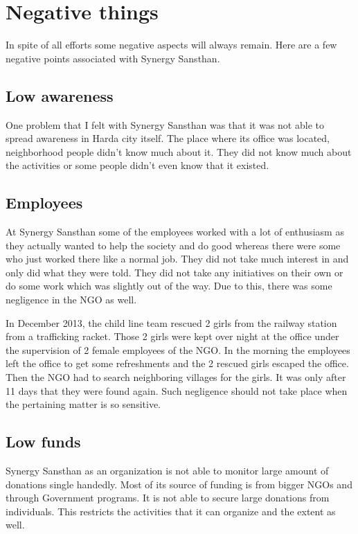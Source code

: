 \chapter{Negative things}
\ifpdf
    \graphicspath{{Chapter2/Chapter2Figs/PNG/}{Chapter2/Chapter2Figs/PDF/}{Chapter2/Chapter2Figs/}}
\else
    \graphicspath{{Chapter2/Chapter2Figs/EPS/}{Chapter2/Chapter2Figs/}}
\fi

In spite of all efforts some negative aspects will always remain. Here are a few negative points associated with Synergy Sansthan.

\section{Low awareness}
One problem that I felt with Synergy Sansthan was that it was not able to spread awareness in Harda city itself. The place where its office was located, neighborhood people didn't know much about it. They did not know much about the activities or some people didn't even know that it existed.

\section{Employees}
At Synergy Sansthan some of the employees worked with a lot of enthusiasm as they actually wanted to help the society and do good whereas there were some who just worked there like a normal job. They did not take much interest in and only did what they were told. They did not take any initiatives on their own or do some work which was slightly out of the way. Due to this, there was some negligence in the NGO as well. 

In December 2013, the child line team rescued 2 girls from the railway station from a trafficking racket. Those 2 girls were kept over night at the office under the supervision of 2 female employees of the NGO. In the morning the employees left the office to get some refreshments and the 2 rescued girls escaped the office. Then the NGO had to search neighboring villages for the girls. It was only after 11 days that they were found again. Such negligence should not take place when the pertaining matter is so sensitive. 

\section{Low funds}
Synergy Sansthan as an organization is not able to monitor large amount of donations single handedly. Most of its source of funding is from bigger NGOs and through Government programs. It is not able to secure large donations from individuals. This restricts the activities that it can organize and the extent as well.

